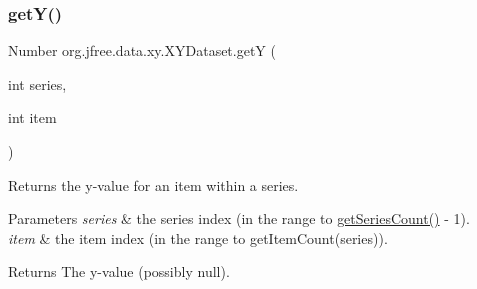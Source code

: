 \mbox{\label{interfaceorg_1_1jfree_1_1data_1_1xy_1_1_x_y_dataset_aa915867221e0f94021bad3140db5254e}} 
\subsubsection{\texorpdfstring{get\+Y()}{getY()}}
{\footnotesize\ttfamily Number org.\+jfree.\+data.\+xy.\+X\+Y\+Dataset.\+getY (\begin{DoxyParamCaption}\item[{int}]{series,  }\item[{int}]{item }\end{DoxyParamCaption})}

Returns the y-\/value for an item within a series.


\begin{DoxyParams}{Parameters}
{\em series} & the series index (in the range {} to {\ttfamily \mbox{\hyperlink{interfaceorg_1_1jfree_1_1data_1_1general_1_1_series_dataset_a84fe822f5918f941d9de1ed1b73c9f58}{get\+Series\+Count()}} -\/ 1}). \\
\hline
{\em item} & the item index (in the range {} to {\ttfamily get\+Item\+Count(series)}).\\
\hline
\end{DoxyParams}
\begin{DoxyReturn}{Returns}
The y-\/value (possibly {\ttfamily null}). 
\end{DoxyReturn}


